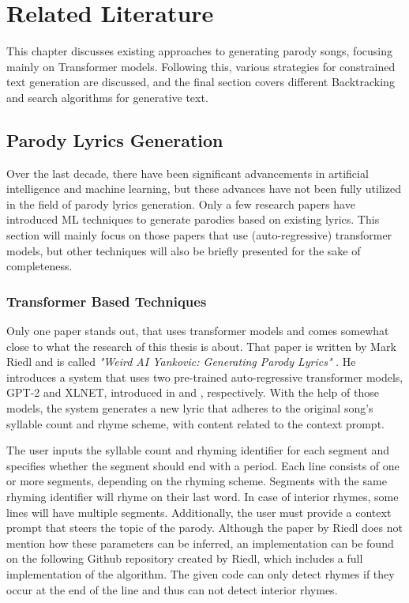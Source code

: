 \chapter{Related Literature}
\label{cha:3}
This chapter discusses existing approaches to generating parody songs, focusing mainly on Transformer models. Following this, various strategies for constrained text generation are discussed, and the final section covers different Backtracking and search algorithms for generative text. 

\section{Parody Lyrics Generation}
Over the last decade, there have been significant advancements in artificial intelligence and machine learning, but these advances have not been fully utilized in the field of parody lyrics generation. Only a few research papers have introduced ML techniques to generate parodies based on existing lyrics. This section will mainly focus on those papers that use (auto-regressive) transformer models, but other techniques will also be briefly presented for the sake of completeness.
\subsection{Transformer Based Techniques}
Only one paper stands out, that uses transformer models and comes somewhat close to what the research of this thesis is about. That paper is written by Mark Riedl and is called \textit{"Weird AI Yankovic: Generating Parody Lyrics"} \cite{riedl_weird_2020}. He introduces a system that uses two pre-trained auto-regressive transformer models, GPT-2 and XLNET, introduced in \cite{gpt-2} and \cite{XLNET}, respectively. With the help of those models, the system generates a new lyric that adheres to the original song's syllable count and rhyme scheme, with content related to the context prompt. 

The user inputs the syllable count and rhyming identifier for each segment and specifies whether the segment should end with a period. Each line consists of one or more segments, depending on the rhyming scheme. Segments with the same rhyming identifier will rhyme on their last word. In case of interior rhymes, some lines will have multiple segments. Additionally, the user must provide a context prompt that steers the topic of the parody. Although the paper by Riedl does not mention how these parameters can be inferred, an implementation can be found on the following Github repository \cite{riedl_weirdai_Github} created by Riedl, which includes a full implementation of the algorithm. The given code can only detect rhymes if they occur at the end of the line and thus can not detect interior rhymes. 

